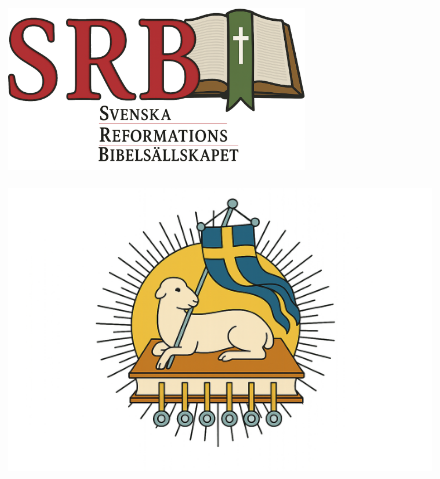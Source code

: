 \begin{figure}[h!]
  \centering
  \begin{adjustbox}{center}
    \includegraphics[width=0.70\textwidth]{misc/srb_logo_2025/main_srb_v16_lower_text_innershadow.png}
  \end{adjustbox}
\end{figure}

\begin{figure}[h!]
  \centering
  \begin{adjustbox}{center}
    \includegraphics[width=1.05\textwidth]{misc/kanmanlitapåbible2000/dragen_ut_får_svensk_flagg_01.png}
  \end{adjustbox}
\end{figure}


